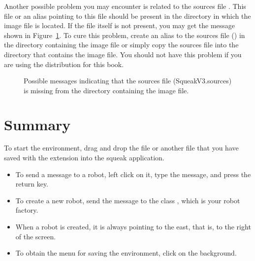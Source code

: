 \documentclass[a4paper,10pt,twoside]{book}
\begin{document}
Another possible problem you may encounter is related to the sources file . 
This file or an alias pointing to this file should be present in the directory in which the image file 
is located. If the file itself is not present, you may get the message shown in Figure~\ref{fig:sourcesMissing}. To cure 
this problem, create an alias to the sources file () in the directory containing 
the image file or simply copy the sources file into the directory that contains the image file. You 
should not have this problem if you are using the distribution for this book. 

\begin{figure}[!h]%
\caption{Possible messages indicating that the sources file (SqueakV3.sources) is missing from the directory containing the image file.\label{fig:sourcesMissing}}
\end{figure}


\section{Summary}
To start the environment, drag and drop the file  or another file that you have 
saved with the  extension into the squeak application. 

\begin{itemize}
\item To send a message to a robot, left click on it, type the message, and press the return key. 
\item To create a new robot, send the message  to the class , which is your robot factory. 
\item When a robot is created, it is always pointing to the east, that is, to the right of the 
screen. 
\item To obtain the menu for saving the environment, click on the background. 
\end{itemize}



\ifx\wholebook\relax\else
    
\end{document}
